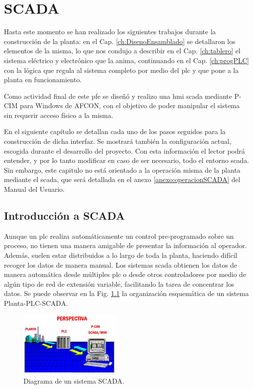 \chapter{SCADA}
\label{ch:scada}

Hasta este momento se han realizado los siguientes trabajos durante la
construcción de la planta: en el Cap.
\ref{ch:DisenoEnsamblado} se detallaron los elementos de la misma, lo que nos
condujo a describir en el Cap. \ref{ch:tablero} el sistema eléctrico y
electrónico que la anima, continuando en el Cap. \ref{ch:progPLC} con la
lógica que regula al sistema completo por medio del \gls{plc} y que pone a la 
planta en funcionamiento. 

Como actividad final de este \gls{pfe} se diseñó y realizo una \gls{hmi}
\gls{scada} mediante P-CIM para Windows de AFCON, con el objetivo de poder
manipular el sistema sin requerir acceso físico a la misma.

En el siguiente capítulo se detallan cada uno de los pasos seguidos para la 
construcción de dicha interfaz.
Se mostrará también la configuración actual, escogida durante el desarrollo del
proyecto.
Con esta información el lector podrá entender, y por lo
tanto modificar en caso de ser necesario, todo el entorno \gls{scada}. Sin
embargo, este capitulo no está orientado a la operación misma de la planta
mediante el \gls{scada}, que será detallada en el anexo
\ref{anexo:operacionSCADA} del Manual del Usuario. 

\section{Introducción a SCADA}
\label{sec:IntroScada}
Aunque un \gls{plc} realiza automáticamente un control pre-programado sobre un 
proceso, no tienen una manera amigable de presentar la información al operador.
Además, suelen estar distribuidos a lo largo de toda la planta, haciendo
difícil recoger los datos de manera manual.
Los sistemas \gls{scada} obtienen los datos de manera
automática desde múltiples \gls{plc} o desde otros controladores por medio de 
algún tipo de red de extensión variable, facilitando la tarea de concentrar 
los datos. Se puede observar en la Fig. \ref{fig:perspectivaSCADA} la
organización esquemática de un sistema Planta-PLC-SCADA.
\begin{figure}[ht!]
	\centering
	\includegraphics[width=0.445\textwidth]
	{Cap5-SCADA/images/perspectiva.jpeg}
	\caption{Diagrama de un sistema SCADA.}
	\label{fig:perspectivaSCADA}
\end{figure}

